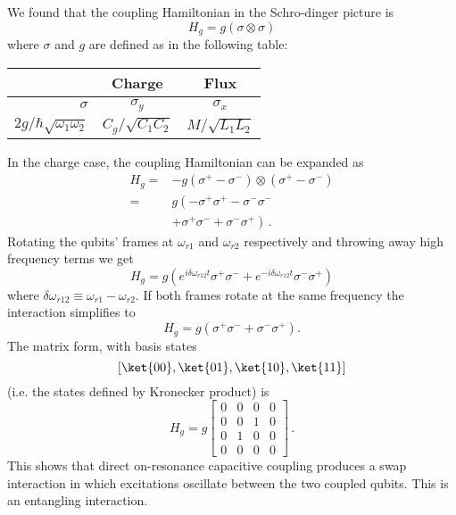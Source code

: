 
We found that the coupling Hamiltonian in the Schro-dinger picture is
\begin{equation}
H_g = g \left( \sigma \otimes \sigma \right)
\end{equation}
where $\sigma$ and $g$ are defined as in the following table:
\begin{center}
  \begin{tabular}{|r|c|c|}
    \hline
    & \textbf{Charge} & \textbf{Flux} \\
    \hline \hline
    $\sigma$ & $\sigma_y$ & $\sigma_x$ \\
    \hline
    $2g/\hbar \sqrt{\omega_1 \omega_2}$ & $C_g / \sqrt{C_1 C_2}$ & $M/\sqrt{L_1L_2}$ \\
    \hline
  \end{tabular}
\end{center}
In the charge case, the coupling Hamiltonian can be expanded as
\begin{align}
  H_g
    =& -g (\sigma^+ - \sigma^-) \otimes (\sigma^+ - \sigma^-) \nonumber \\
    =& g \left(-\sigma^+ \sigma^+ - \sigma^- \sigma^- \right. \nonumber \\
     & \left. + \sigma^+ \sigma^- + \sigma^- \sigma^+ \right) \, .
\end{align}
Rotating the qubits' frames at $\omega_{r1}$ and $\omega_{r2}$ respectively and throwing away high frequency terms we get \begin{equation}
H_g = g \left( e^{i \delta\omega_{r12} t} \sigma^+ \sigma^- + e^{-i \delta\omega_{r12} t} \sigma^- \sigma^+ \right) \end{equation}
where $\delta\omega_{r12}\equiv \omega_{r1} - \omega_{r2}$.
If both frames rotate at the same frequency the interaction simplifies to \begin{equation}
H_g = g \left( \sigma^+ \sigma^- + \sigma^- \sigma^+ \right). \end{equation}
The matrix form, with basis states \begin{equation}
\left[ \ket{00}, \ket{01}, \ket{10}, \ket{11} \right] \nonumber \end{equation}
(i.e. the states defined by Kronecker product) is
\begin{equation}
  H_g =
  g \left[ \begin{array}{cccc}
    0 & 0 & 0 & 0 \\
    0 & 0 & 1 & 0 \\
    0 & 1 & 0 & 0 \\
    0 & 0 & 0 & 0
  \end{array} \right] \, .
\end{equation}
This shows that direct on-resonance capacitive coupling produces a swap interaction in which excitations oscillate between the two coupled qubits.
This is an entangling interaction.

